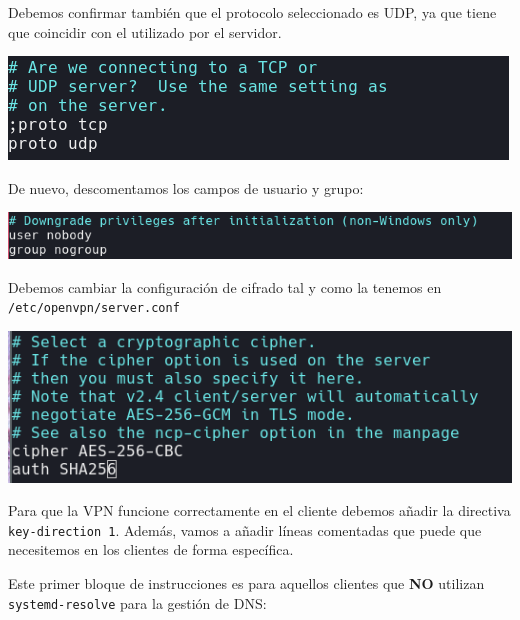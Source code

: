 \documentclass[11pt,a4paper]{article}
\begin{document}
\medskip

Debemos confirmar también que el protocolo seleccionado es UDP, ya que tiene que coincidir con el utilizado por el servidor.

\medskip

\begin{center}
\includegraphics[scale=0.4]{proto-udp.png}
\end{center}

\medskip

De nuevo, descomentamos los campos de usuario y grupo:

\medskip

\begin{center}
\includegraphics[scale=0.4]{user-client.png}
\end{center}

\medskip

Debemos cambiar la configuración de cifrado tal y como la tenemos en \texttt{/etc/openvpn/server.conf}

\medskip

\begin{center}
\includegraphics[scale=0.4]{auth-client.png}
\end{center}

\bigskip

Para que la VPN funcione correctamente en el cliente debemos añadir la directiva \texttt{key-direction 1}. Además, vamos a añadir líneas comentadas que puede que necesitemos en los clientes de forma específica.

\medskip

Este primer bloque de instrucciones es para aquellos clientes que \textbf{NO} utilizan \texttt{systemd-resolve} para la gestión de DNS:
\end{document}
